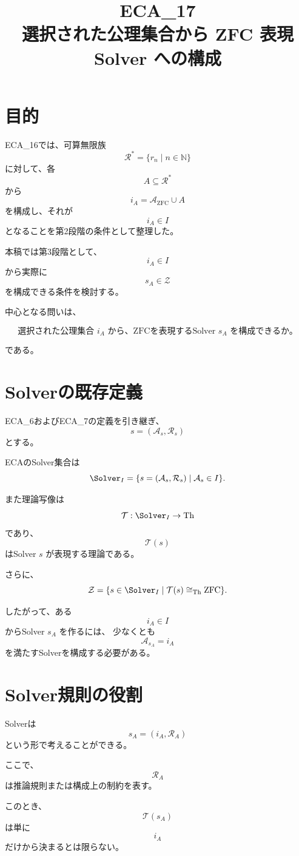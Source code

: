 \documentclass[11pt,a4paper]{article}
\title{ECA\_17\\選択された公理集合から ZFC 表現 Solver への構成}
\author{}
\date{}
\begin{document}
\maketitle

\section{目的}

ECA\_16では、可算無限族
\[
\mathcal R^*=\{r_n\mid n\in\mathbb N\}
\]
に対して、各
\[
A\subseteq\mathcal R^*
\]
から
\[
i_A=\mathcal A_{\mathrm{ZFC}}\cup A
\]
を構成し、それが
\[
i_A\in I
\]
となることを第2段階の条件として整理した。

本稿では第3段階として、
\[
i_A\in I
\]
から実際に
\[
s_A\in\mathcal Z
\]
を構成できる条件を検討する。

中心となる問いは、

\[
\boxed{
\text{選択された公理集合 }i_A
\text{ から、ZFCを表現するSolver }s_A\text{ を構成できるか。}
}
\]

である。

\section{Solverの既存定義}

ECA\_6およびECA\_7の定義を引き継ぎ、
\[
s=(\mathcal A_s,\mathcal R_s)
\]
とする。

ECAのSolver集合は
\[
\Solver_I
=
\{s=(\mathcal A_s,\mathcal R_s)\mid
\mathcal A_s\in I\}.
\]

また理論写像は
\[
\mathcal T:\Solver_I\to\mathrm{Th}
\]
であり、
\[
\mathcal T(s)
\]
はSolver $s$ が表現する理論である。

さらに、
\[
\mathcal Z
=
\{s\in\Solver_I\mid
\mathcal T(s)\cong_{\mathrm{Th}}\mathrm{ZFC}\}.
\]

したがって、ある
\[
i_A\in I
\]
からSolver $s_A$ を作るには、
少なくとも
\[
\mathcal A_{s_A}=i_A
\]
を満たすSolverを構成する必要がある。

\section{Solver規則の役割}

Solverは
\[
s_A=(i_A,\mathcal R_A)
\]
という形で考えることができる。

ここで、
\[
\mathcal R_A
\]
は推論規則または構成上の制約を表す。

このとき、
\[
\mathcal T(s_A)
\]
は単に
\[
i_A
\]
だけから決まるとは限らない。
\end{document}
